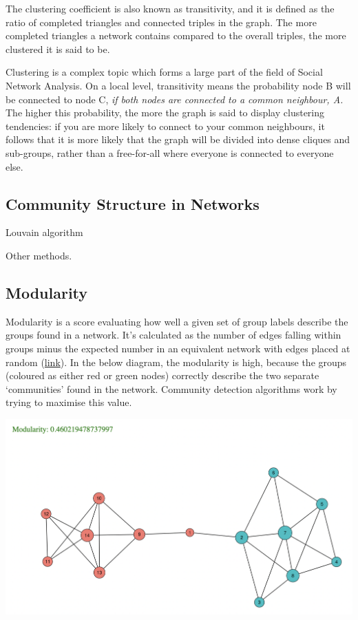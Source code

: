 \documentclass[
]{book}
\begin{document}
The clustering coefficient is also known as transitivity, and it is defined as the ratio of completed triangles and connected triples in the graph. The more completed triangles a network contains compared to the overall triples, the more clustered it is said to be.

Clustering is a complex topic which forms a large part of the field of Social Network Analysis. On a local level, transitivity means the probability node B will be connected to node C, \emph{if both nodes are connected to a common neighbour, A.} The higher this probability, the more the graph is said to display clustering tendencies: if you are more likely to connect to your common neighbours, it follows that it is more likely that the graph will be divided into dense cliques and sub-groups, rather than a free-for-all where everyone is connected to everyone else.

\hypertarget{community-structure-in-networks}{%
\subsection{Community Structure in Networks}\label{community-structure-in-networks}}

Louvain algorithm

Other methods.

\hypertarget{modularity}{%
\subsection{Modularity}\label{modularity}}

Modularity is a score evaluating how well a given set of group labels describe the groups found in a network. It's calculated as the number of edges falling within groups minus the expected number in an equivalent network with edges placed at random (\href{https://www.pnas.org/content/103/23/8577}{link}). In the below diagram, the modularity is high, because the groups (coloured as either red or green nodes) correctly describe the two separate `communities' found in the network. Community detection algorithms work by trying to maximise this value.

\includegraphics{images/modularity.png}
\end{document}
